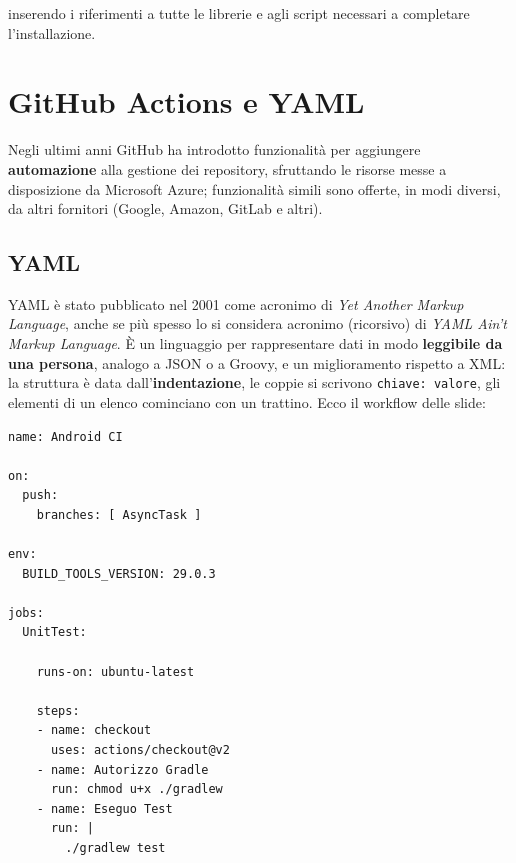 \noindent inserendo i riferimenti a tutte le librerie e agli script necessari a completare l'installazione.

\section{GitHub Actions e YAML}

Negli ultimi anni GitHub ha introdotto funzionalità per aggiungere \textbf{automazione} alla gestione dei repository,
sfruttando le risorse messe a disposizione da Microsoft Azure; funzionalità simili sono offerte, in modi diversi, da
altri fornitori (Google, Amazon, GitLab e altri).


\subsection{YAML}

YAML è stato pubblicato nel 2001 come acronimo di \textit{Yet Another Markup Language}, anche se più spesso lo si
considera acronimo (ricorsivo) di \textit{YAML Ain't Markup Language}. È un linguaggio per rappresentare dati in modo
\textbf{leggibile da una persona}, analogo a JSON o a Groovy, e un miglioramento rispetto a XML: la struttura è data
dall'\textbf{indentazione}, le coppie si scrivono \texttt{chiave: valore}, gli elementi di un elenco cominciano con un
trattino. Ecco il workflow delle slide:

\begin{lstlisting}[style=yaml, name=android.yml]
name: Android CI

on:
  push:
    branches: [ AsyncTask ]

env:
  BUILD_TOOLS_VERSION: 29.0.3

jobs:
  UnitTest:

    runs-on: ubuntu-latest

    steps:
    - name: checkout
      uses: actions/checkout@v2
    - name: Autorizzo Gradle
      run: chmod u+x ./gradlew
    - name: Eseguo Test
      run: |
        ./gradlew test
\end{lstlisting}

